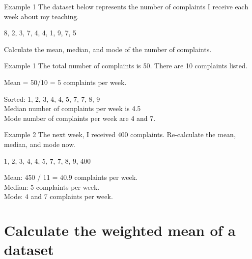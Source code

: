 \documentclass[t]{beamer}
\begin{document}
\begin{frame}{Example 1}
The dataset below represents the number of complaints I receive each week about my teaching. \newline\\
\begin{center}
8, 2, 3, 7, 4, 4, 1, 9, 7, 5
\end{center}
\vspace{8pt}

Calculate the mean, median, and mode of the number of complaints.
\end{frame}

\begin{frame}{Example 1}
The total number of complaints is 50. There are 10 complaints listed.	\newline\\	\pause
\begin{center}
Mean = 50/10 = 5 complaints per week.
\end{center}
\vspace{8pt}	\pause

Sorted: 1, 2, 3, 4, 4, 5, 7, 7, 8, 9	\newline\\	\pause
Median number of complaints per week is 4.5	\newline\\	\pause
Mode number of complaints per week are 4 and 7.
\end{frame}

\begin{frame}{Example 2}
The next week, I received 400 complaints. Re-calculate the mean, median, and mode now.	\newline\\	\pause
\begin{center}
1, 2, 3, 4, 4, 5, 7, 7, 8, 9, 400
\end{center}
\vspace{8pt}	\pause

Mean: 450 / 11 = 40.9 complaints per week.	\newline\\	\pause
Median: 5 complaints per week.	\newline\\	\pause
Mode: 4 and 7 complaints per week.
\end{frame}


\section{Calculate the weighted mean of a dataset}
\end{document}
